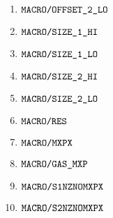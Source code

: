 \begin{description}
\begin{multicols}{3}
\begin{enumerate}
				\item $\mxpMacroOffsetTwoLo  $
				\item $\mxpMacroSizeOneHi    $
				\item $\mxpMacroSizeOneLo    $
				\item $\mxpMacroSizeTwoHi    $
				\item $\mxpMacroSizeTwoLo    $
				\item $\mxpMacroRes          $
				\item $\mxpMacroMxpx         $
				\item $\mxpMacroGasMxp       $
				\item $\mxpMacroSOneNzNoMxpx $
				\item $\mxpMacroSTwoNzNoMxpx $
			\end{enumerate}
		\end{multicols}
\end{description}

